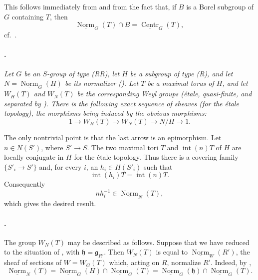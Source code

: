This follows immediately from  and from the fact that, if
\(B\) is a Borel subgroup of \(G\) containing \(T\), then
\[
  \underline{\operatorname{Norm}}_G(T)\cap B
  =
  \underline{\operatorname{Centr}}_G(T),
\]
cf.\ .

\paragraph{.}
\textit{Let \(G\) be an \(S\)-group of type \textup{(RR)}, let
\(H\) be a subgroup of type \textup{(R)}, and let
\(N=\underline{\operatorname{Norm}}_G(H)\) be its normalizer
\textup{()}. Let \(T\) be a maximal torus of \(H\), and let
\(W_H(T)\) and \(W_N(T)\) be the corresponding Weyl groups
\textup{(étale, quasi-finite, and separated by )}.
There is the following exact sequence of sheaves \textup{(for the
étale topology)}, the morphisms being induced by the obvious
morphisms:}
\[
  1
  \longrightarrow W_H(T)
  \longrightarrow W_N(T)
  \longrightarrow N/H
  \longrightarrow 1.
\]

The only nontrivial point is that the last arrow is an epimorphism.
Let \(n\in N(S')\), where \(S'\to S\). The two maximal tori \(T\)
and \(\operatorname{int}(n)T\) of \(H\) are locally conjugate in
\(H\) for the étale topology. Thus there is a covering family
\(\{S'_i\to S'\}\) and, for every \(i\), an
\(h_i\in H(S'_i)\) such that
\[
  \operatorname{int}(h_i)T=\operatorname{int}(n)T.
\]
Consequently
\[
  nh_i^{-1}\in \underline{\operatorname{Norm}}_N(T),
\]
which gives the desired result.

\paragraph{.}
The group \(W_N(T)\) may be described as follows. Suppose that we
have reduced to the situation of , with
\(\mathfrak h=\mathfrak g_{R'}\). Then \(W_N(T)\) is equal to
\(\underline{\operatorname{Norm}}_W(R')\), the sheaf of sections
of \(W=W_G(T)\) which, acting on \(R\), normalize \(R'\). Indeed,
by ,
\[
  \underline{\operatorname{Norm}}_N(T)
  =
  \underline{\operatorname{Norm}}_G(H)
    \cap \underline{\operatorname{Norm}}_G(T)
  =
  \underline{\operatorname{Norm}}_G(\mathfrak h)
    \cap \underline{\operatorname{Norm}}_G(T).
\]

